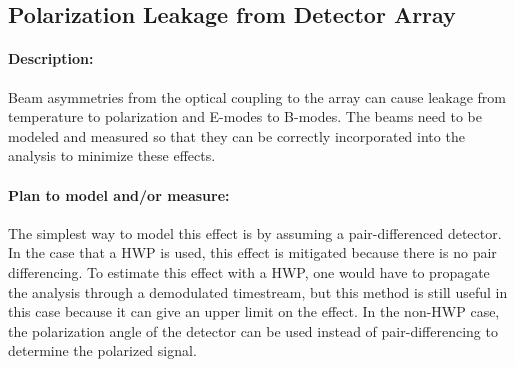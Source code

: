 \subsection{Polarization Leakage from Detector Array}

\paragraph{Description:}

Beam asymmetries from the optical coupling to the array can cause leakage from temperature to polarization and E-modes to B-modes. The beams need to be modeled and measured so that they can be correctly incorporated into the analysis to minimize these effects.

\paragraph{Plan to model and/or measure:}
The simplest way to model this effect is by assuming a pair-differenced detector. In the case that a HWP is used, this effect is mitigated because there is no pair differencing. To estimate this effect with a HWP, one would have to propagate the analysis through a demodulated timestream, but this method is still useful in this case because it can give an upper limit on the effect. In the non-HWP case, the polarization angle of the detector can be used instead of pair-differencing to determine the polarized signal.

